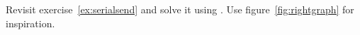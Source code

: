   \label{ex:rightgraph}
  Revisit exercise~\ref{ex:serialsend} and solve it using
  . Use figure~\ref{fig:rightgraph} for inspiration.
